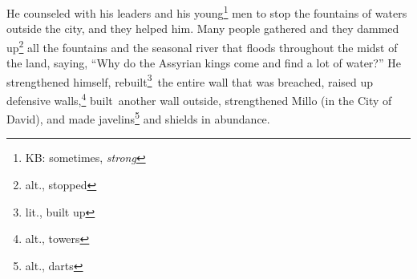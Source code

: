 
\begin{inparaenum}
     He counseled with his leaders and his young\footnote{KB: sometimes, \textit{strong}} men to stop the fountains of waters outside the city, and they helped him.%
     Many people gathered and they dammed up\footnote{alt., stopped} all the fountains and the seasonal river that floods throughout the midst of the land, saying, ``Why do the Assyrian kings come and find a lot of water?''%
     He strengthened himself, rebuilt\footnote{lit., built up}\thinspace\understood\ the entire wall that was breached, raised up defensive walls,\footnote{alt., towers} built\understood\ another wall outside, strengthened Millo (in the City of David), and made javelins\footnote{alt., darts} and shields in abundance.%
    
    
    
    
\end{inparaenum}
